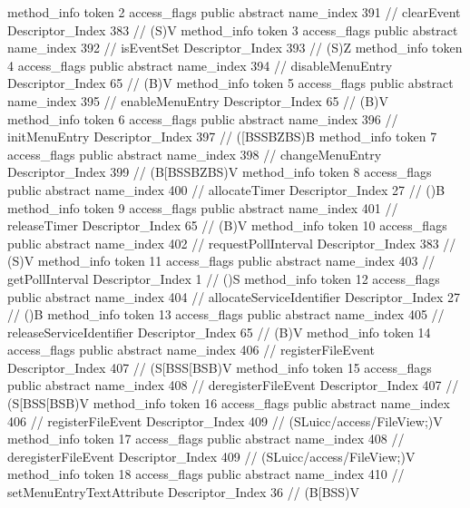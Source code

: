{{{{{				}
				method_info {
					token	2
					access_flags	public abstract
					name_index	391		// clearEvent
					Descriptor_Index	383		// (S)V
				}
				method_info {
					token	3
					access_flags	public abstract
					name_index	392		// isEventSet
					Descriptor_Index	393		// (S)Z
				}
				method_info {
					token	4
					access_flags	public abstract
					name_index	394		// disableMenuEntry
					Descriptor_Index	65		// (B)V
				}
				method_info {
					token	5
					access_flags	public abstract
					name_index	395		// enableMenuEntry
					Descriptor_Index	65		// (B)V
				}
				method_info {
					token	6
					access_flags	public abstract
					name_index	396		// initMenuEntry
					Descriptor_Index	397		// ([BSSBZBS)B
				}
				method_info {
					token	7
					access_flags	public abstract
					name_index	398		// changeMenuEntry
					Descriptor_Index	399		// (B[BSSBZBS)V
				}
				method_info {
					token	8
					access_flags	public abstract
					name_index	400		// allocateTimer
					Descriptor_Index	27		// ()B
				}
				method_info {
					token	9
					access_flags	public abstract
					name_index	401		// releaseTimer
					Descriptor_Index	65		// (B)V
				}
				method_info {
					token	10
					access_flags	public abstract
					name_index	402		// requestPollInterval
					Descriptor_Index	383		// (S)V
				}
				method_info {
					token	11
					access_flags	public abstract
					name_index	403		// getPollInterval
					Descriptor_Index	1		// ()S
				}
				method_info {
					token	12
					access_flags	public abstract
					name_index	404		// allocateServiceIdentifier
					Descriptor_Index	27		// ()B
				}
				method_info {
					token	13
					access_flags	public abstract
					name_index	405		// releaseServiceIdentifier
					Descriptor_Index	65		// (B)V
				}
				method_info {
					token	14
					access_flags	public abstract
					name_index	406		// registerFileEvent
					Descriptor_Index	407		// (S[BSS[BSB)V
				}
				method_info {
					token	15
					access_flags	public abstract
					name_index	408		// deregisterFileEvent
					Descriptor_Index	407		// (S[BSS[BSB)V
				}
				method_info {
					token	16
					access_flags	public abstract
					name_index	406		// registerFileEvent
					Descriptor_Index	409		// (SLuicc/access/FileView;)V
				}
				method_info {
					token	17
					access_flags	public abstract
					name_index	408		// deregisterFileEvent
					Descriptor_Index	409		// (SLuicc/access/FileView;)V
				}
				method_info {
					token	18
					access_flags	public abstract
					name_index	410		// setMenuEntryTextAttribute
					Descriptor_Index	36		// (B[BSS)V
				}
			}
		}
}}
